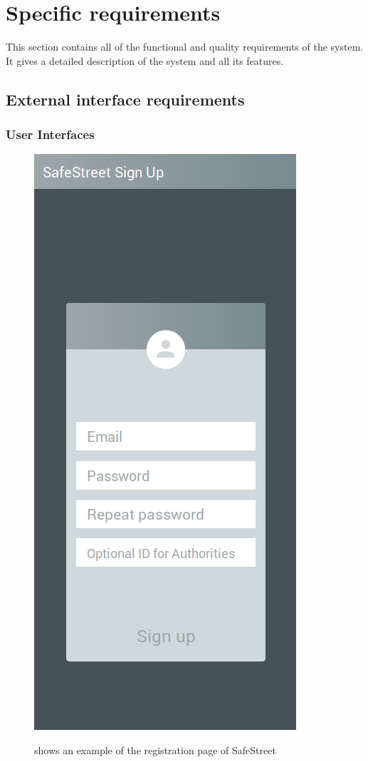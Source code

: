 \documentclass[../RASD.tex]{subfiles}
\begin{document}
    \chapter{Specific requirements}\label{ch:specific-requirements}
    This section contains all of the functional and quality requirements of the system. It gives a detailed description of the system and all its features.
        \section{External interface requirements}\label{sec:external-interface-requirements}
            \subsection{User Interfaces}\label{subsec:user-interfaces}
            \begin{figure}[H]
                \centering
                \includegraphics[scale = 0.4]{assets/signup.png}\\[1.6 cm]
                \caption[\textit{User} Sign Up \textit{Mockup}]{shows an example of the registration page of SafeStreet}
            \end{figure}
\end{document}
